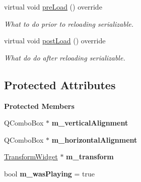 \begin{Indent}
\begin{DoxyCompactItemize}
\mbox{\label{classrev_1_1_view_1_1_glyph_widget_a0f1e2fd038b40ce5d32e102fd4598e3b}} 
virtual void \mbox{\hyperlink{classrev_1_1_view_1_1_glyph_widget_a0f1e2fd038b40ce5d32e102fd4598e3b}{pre\+Load}} () override
\begin{DoxyCompactList}\small\item\em What to do prior to reloading serializable. \end{DoxyCompactList}\item 
\mbox{\label{classrev_1_1_view_1_1_glyph_widget_aca1229804212117888e01d101bbd4c2b}} 
virtual void \mbox{\hyperlink{classrev_1_1_view_1_1_glyph_widget_aca1229804212117888e01d101bbd4c2b}{post\+Load}} () override
\begin{DoxyCompactList}\small\item\em What do do after reloading serializable. \end{DoxyCompactList}\end{DoxyCompactItemize}
\end{Indent}
\subsection*{Protected Attributes}
\begin{Indent}\textbf{ Protected Members}\par
\begin{DoxyCompactItemize}
\item 
\mbox{\label{classrev_1_1_view_1_1_glyph_widget_ad9f1f210970a2040ad10d3695b37057f}} 
Q\+Combo\+Box $\ast$ {\bfseries m\+\_\+vertical\+Alignment}
\item 
\mbox{\label{classrev_1_1_view_1_1_glyph_widget_a622a63c218c558ee1708ab7d874bb63f}} 
Q\+Combo\+Box $\ast$ {\bfseries m\+\_\+horizontal\+Alignment}
\item 
\mbox{\label{classrev_1_1_view_1_1_glyph_widget_a8d477cc23e0f99ec85a52c3cc4047be5}} 
\mbox{\hyperlink{classrev_1_1_view_1_1_transform_widget}{Transform\+Widget}} $\ast$ {\bfseries m\+\_\+transform}
\item 
\mbox{\label{classrev_1_1_view_1_1_glyph_widget_ae44aee80e43ba926928d98781696e9f1}} 
bool {\bfseries m\+\_\+was\+Playing} = true
\end{DoxyCompactItemize}
\end{Indent}
